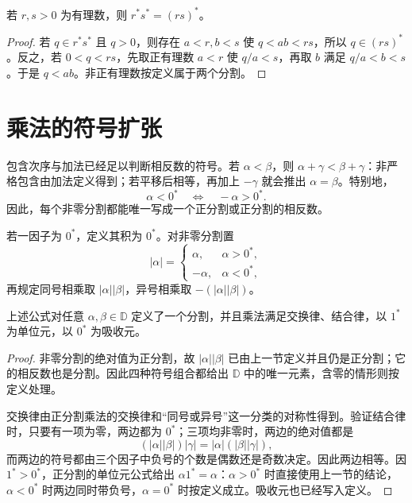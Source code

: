 \begin{proposition}
若 \(r,s>0\) 为有理数，则 \(r^*s^*=(rs)^*\)。
\end{proposition}

\begin{proof}
若 \(q\in r^*s^*\) 且 \(q>0\)，则存在 \(a<r,b<s\) 使 \(q<ab<rs\)，所以 \(q\in(rs)^*\)。反之，若 \(0<q<rs\)，先取正有理数 \(a<r\) 使 \(q/a<s\)，再取 \(b\) 满足 \(q/a<b<s\)。于是 \(q<ab\)。非正有理数按定义属于两个分割。
\end{proof}

\section{乘法的符号扩张}

包含次序与加法已经足以判断相反数的符号。若 \(\alpha<\beta\)，则
\(\alpha+\gamma<\beta+\gamma\)：非严格包含由加法定义得到；若平移后相等，再加上 \(-\gamma\) 就会推出 \(\alpha=\beta\)。特别地，
\[
  \alpha<0^*\quad\Longleftrightarrow\quad-\alpha>0^*.
\]
因此，每个非零分割都能唯一写成一个正分割或正分割的相反数。

若一因子为 \(0^*\)，定义其积为 \(0^*\)。对非零分割置
\[
 |\alpha|=\begin{cases}
 \alpha,&\alpha>0^*,\\
 -\alpha,&\alpha<0^*,
 \end{cases}
\]
再规定同号相乘取 \(|\alpha||\beta|\)，异号相乘取
\(-(|\alpha||\beta|)\)。

\begin{proposition}
上述公式对任意 \(\alpha,\beta\in\mathbb D\) 定义了一个分割，并且乘法满足交换律、结合律，以 \(1^*\) 为单位元，以 \(0^*\) 为吸收元。
\end{proposition}

\begin{proof}
非零分割的绝对值为正分割，故 \(|\alpha||\beta|\) 已由上一节定义并且仍是正分割；它的相反数也是分割。因此四种符号组合都给出 \(\mathbb D\) 中的唯一元素，含零的情形则按定义处理。

交换律由正分割乘法的交换律和“同号或异号”这一分类的对称性得到。验证结合律时，只要有一项为零，两边都为 \(0^*\)；三项均非零时，两边的绝对值都是
\[
  (|\alpha||\beta|)|\gamma|
  =|\alpha|(|\beta||\gamma|),
\]
而两边的符号都由三个因子中负号的个数是偶数还是奇数决定。因此两边相等。因 \(1^*>0^*\)，正分割的单位元公式给出 \(\alpha1^*=\alpha\)：\(\alpha>0^*\) 时直接使用上一节的结论，\(\alpha<0^*\) 时两边同时带负号，\(\alpha=0^*\) 时按定义成立。吸收元也已经写入定义。
\end{proof}

